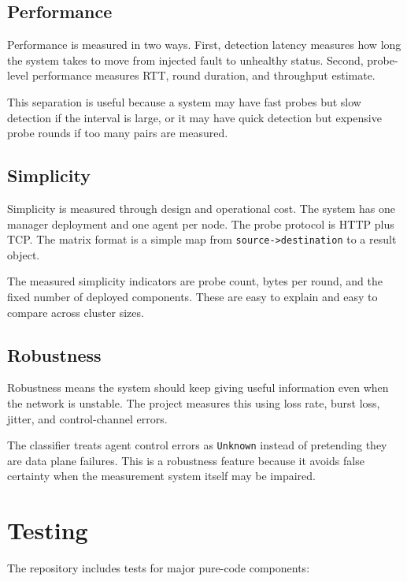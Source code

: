 \documentclass[11pt,a4paper]{article}
\newcommand{\code}[1]{\texttt{#1}}
\begin{document}
\subsection{Performance}

Performance is measured in two ways. First, detection latency measures how long the system takes to move from injected fault to unhealthy status. Second, probe-level performance measures RTT, round duration, and throughput estimate.

This separation is useful because a system may have fast probes but slow detection if the interval is large, or it may have quick detection but expensive probe rounds if too many pairs are measured.

\subsection{Simplicity}

Simplicity is measured through design and operational cost. The system has one manager deployment and one agent per node. The probe protocol is HTTP plus TCP. The matrix format is a simple map from \code{source->destination} to a result object.

The measured simplicity indicators are probe count, bytes per round, and the fixed number of deployed components. These are easy to explain and easy to compare across cluster sizes.

\subsection{Robustness}

Robustness means the system should keep giving useful information even when the network is unstable. The project measures this using loss rate, burst loss, jitter, and control-channel errors.

The classifier treats agent control errors as \code{Unknown} instead of pretending they are data plane failures. This is a robustness feature because it avoids false certainty when the measurement system itself may be impaired.

\section{Testing}

The repository includes tests for major pure-code components:
\end{document}
